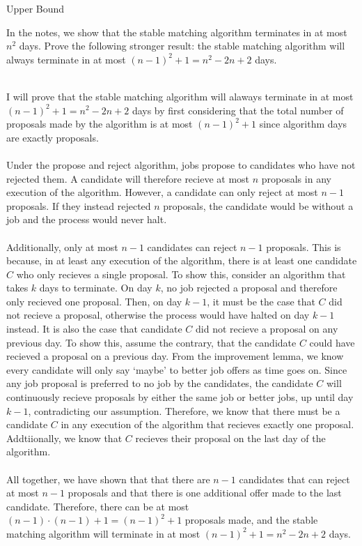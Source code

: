 \begin{homeworkProblem}{Upper Bound}

    In the notes, we show that the stable matching algorithm terminates in at most $n^2$ days. Prove the following stronger result: the stable matching algorithm will always terminate in at most $(n-1)^2+1=n^2-2n+2$ days.
    \\ \\
    \solution

    I will prove that the stable matching algorithm will alaways terminate in at most $(n-1)^2+1=n^2-2n+2$ days by first considering that the total number of proposals made by the algorithm is at most $(n-1)^2+1$ since algorithm days are exactly proposals. 
    \\ \\
    Under the propose and reject algorithm, jobs propose to candidates who have not rejected them. A candidate will therefore recieve at most $n$ proposals in any execution of the algorithm. However, a candidate can only reject at most $n-1$ proposals. If they instead rejected $n$ proposals, the candidate would be without a job and the process would never halt. 
    \\ \\
    Additionally, only at most $n-1$ candidates can reject $n-1$ proposals. This is because, in at least any execution of the algorithm, there is at least one candidate $C$ who only recieves a single proposal. To show this, consider an algorithm that takes $k$ days to terminate. On day $k$, no job rejected a proposal and therefore only recieved one proposal. Then, on day $k-1$, it must be the case that $C$ did not recieve a proposal, otherwise the process would have halted on day $k-1$ instead. It is also the case that candidate $C$ did not recieve a proposal on any previous day. To show this, assume the contrary, that the candidate $C$ could have recieved a proposal on a previous day. From the improvement lemma, we know every candidate will only say `maybe' to better job offers as time goes on. Since any job proposal is preferred to no job by the candidates, the candidate $C$ will continuously recieve proposals by either the same job or better jobs, up until day $k-1$, contradicting our assumption. Therefore, we know that there must be a candidate $C$ in any execution of the algorithm that recieves exactly one proposal. Addtiionally, we know that $C$ recieves their proposal on the last day of the algorithm. 
    \\ \\
    All together, we have shown that that there are $n-1$ candidates that can reject at most $n-1$ proposals and that there is one additional offer made to the last candidate. Therefore, there can be at most $(n-1) \cdot (n-1) + 1 = (n-1)^2+1$ proposals made, and the stable matching algorithm will terminate in at most $(n-1)^2+1=n^2-2n+2$ days.
    
    
\end{homeworkProblem}